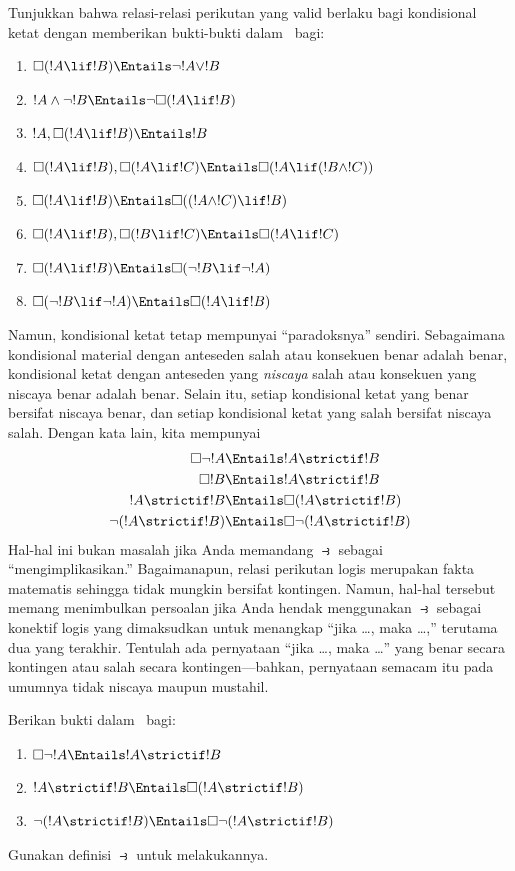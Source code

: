 \documentclass[../../../include/open-logic-section]{subfiles}
\begin{document}
\begin{prob}
  Tunjukkan bahwa relasi-relasi perikutan yang valid berlaku bagi
  kondisional ketat dengan memberikan bukti-bukti dalam~ bagi:
  \begin{enumerate}
  \item  $\Box(!A \lif !B) \Entails \lnot !A \lor !B$
  \item $!A \land \lnot !B \Entails \lnot\Box(!A \lif !B)$
  \item $!A, \Box(!A \lif !B) \Entails !B$
  \item $\Box(!A \lif !B), \Box(!A \lif !C) \Entails \Box(!A \lif (!B
    \land !C))$
  \item $\Box(!A \lif !B) \Entails \Box((!A \land !C) \lif !B)$
  \item $\Box(!A \lif !B), \Box(!B \lif !C) \Entails \Box(!A
    \lif !C)$
  \item $\Box(!A \lif !B) \Entails \Box(\lnot !B \lif \lnot !A)$
  \item $\Box(\lnot !B \lif \lnot !A) \Entails \Box(!A \lif !B)$
  \end{enumerate}
\end{prob}

Namun, kondisional ketat tetap mempunyai ``paradoksnya'' sendiri. Sebagaimana
kondisional material dengan anteseden salah atau konsekuen benar adalah
benar, kondisional ketat dengan anteseden yang \emph{niscaya} salah atau
konsekuen yang niscaya benar adalah benar. Selain itu, setiap kondisional
ketat yang benar bersifat niscaya benar, dan setiap kondisional ketat yang
salah bersifat niscaya salah. Dengan kata lain, kita mempunyai
\begin{align}
  \Box \lnot !A & \Entails !A \strictif !B\\
  \Box !B & \Entails !A \strictif !B\\
  !A \strictif !B& \Entails \Box(!A \strictif !B)\\
  \lnot(!A \strictif !B) & \Entails \Box\lnot(!A \strictif !B)
\end{align}
Hal-hal ini bukan masalah jika Anda memandang $\strictif$ sebagai
``mengimplikasikan.'' Bagaimanapun, relasi perikutan logis merupakan fakta
matematis sehingga tidak mungkin bersifat kontingen. Namun, hal-hal tersebut
memang menimbulkan persoalan jika Anda hendak menggunakan $\strictif$ sebagai
konektif logis yang dimaksudkan untuk menangkap ``jika \dots, maka \dots,''
terutama dua yang terakhir. Tentulah ada pernyataan ``jika \dots, maka
\dots'' yang benar secara kontingen atau salah secara kontingen---bahkan,
pernyataan semacam itu pada umumnya tidak niscaya maupun mustahil.

\begin{prob}
  Berikan bukti dalam~ bagi:
  \begin{enumerate}
    \item  $\Box \lnot !A \Entails !A \strictif !B$
    \item $!A \strictif !B \Entails \Box(!A \strictif !B)$
    \item $\lnot(!A \strictif !B)  \Entails
      \Box\lnot(!A \strictif !B)$
  \end{enumerate}
  Gunakan definisi $\strictif$ untuk melakukannya.
\end{prob}
\end{document}
